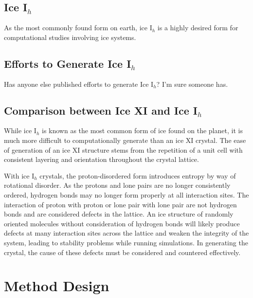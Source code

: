 \subsection{Ice I$_{h}$}

As the most commonly found form on earth, ice I$_{h}$ is a highly desired form for computational studies involving ice systems. 

\subsection{Efforts to Generate Ice I$_{h}$}

Has anyone else published efforts to generate Ice I$_{h}$?
I'm sure someone has.


\subsection{Comparison between Ice XI and Ice I$_{h}$}

While ice I$_{h}$ is known as the most common form of ice found on the planet, it is much more difficult to computationally generate than an ice XI crystal. 
The ease of generation of an ice XI structure stems from the repetition of a unit cell with consistent layering and orientation throughout the crystal lattice. 


With ice I$_{h}$ crystals, the proton-disordered form introduces entropy by way of rotational disorder. 
As the protons and lone pairs are no longer consistently ordered, hydrogen bonds may no longer form properly at all interaction sites. 
The interaction of proton with proton or lone pair with lone pair are not hydrogen bonds and are considered defects in the lattice. 
An ice structure of randomly oriented molecules without consideration of hydrogen bonds will likely produce defects at many interaction sites across the lattice and weaken the integrity of the system, leading to stability problems while running simulations. 
In generating the crystal, the cause of these defects must be considered and countered effectively.



\section{Method Design}


